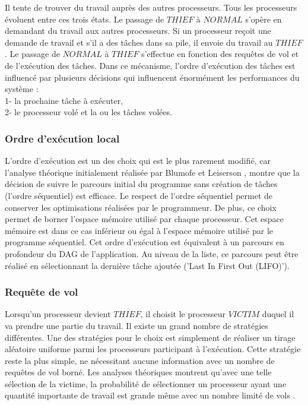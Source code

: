 Il tente de trouver du travail auprès des autres processeurs. 
Tous les processeurs évoluent entre ces trois états. 
Le passage de $THIEF$ à $NORMAL$ s’opère en demandant du travail aux autres processeurs. 
Si un processeur reçoit une demande de travail et s’il a des tâches dans sa pile, il envoie du travail au $THIEF$. 
Le passage de $NORMAL$ à $THIEF$ s’effectue en fonction des requêtes de vol et de l’exécution des tâches.
Dans ce mécanisme, l’ordre d’exécution des tâches est influencé par plusieurs décisions qui influencent énormément les performances du système : \\
1- la prochaine tâche à exécuter, \\
2- le processeur volé et la ou les tâches volées. \\
%
\subsubsection{Ordre d’exécution local}
%
L’ordre d’exécution est un des choix qui est le plus rarement modifié, car l’analyse théorique initialement réalisée par Blumofe et Leiserson \cite{BLU95},  montre que la décision de suivre le parcours initial du programme sans création de tâches (l’ordre séquentiel) est efficace. 
Le respect de l’ordre séquentiel permet de conserver les optimisations réalisées par le programmeur. 
De plus, ce choix permet de borner l’espace mémoire utilisé par chaque processeur. 
Cet espace mémoire est dans ce cas inférieur ou égal à l’espace mémoire utilisé par le programme séquentiel. 
Cet ordre d’exécution est équivalent à un parcours en profondeur du DAG de l’application. 
Au niveau de la liste, ce parcours peut être réalisé en sélectionnant la dernière tâche ajoutée ('Last In First Out (LIFO)').
%
\subsubsection{Requête de vol}
%
Lorsqu’un processeur devient $THIEF$, il choisit le processeur $VICTIM$ duquel il va prendre une partie du travail. 
Il existe un grand nombre de stratégies différentes. 
Une des stratégies pour le choix est simplement de réaliser un tirage aléatoire uniforme parmi les processeurs participant à l’exécution. 
Cette stratégie reste la plus simple, ne nécessitant aucune information avec un nombre de requêtes de vol borné.
Les analyses théoriques montrent qu’avec une telle sélection de la victime, la probabilité de sélectionner un processeur ayant une
quantité importante de travail est grande même avec un nombre limité de vols \cite{BLU95}.


